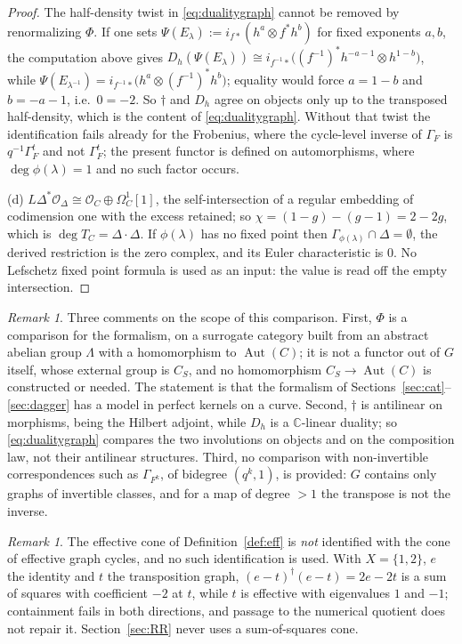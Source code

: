\documentclass[11pt]{amsart}
\theoremstyle{definition}
\theoremstyle{remark}
\newtheorem{remark}[theorem]{Remark}
\newcommand{\C}{\mathbb C}
\newcommand{\Aut}{\operatorname{Aut}}
\begin{document}
\begin{proof}
The half-density twist in \eqref{eq:dualitygraph} cannot be removed by
renormalizing $\Phi$.  If one sets $\Psi(E_{\lambda}):=i_{f*}(h^{a}\otimes
f^{*}h^{b})$ for fixed exponents $a,b$, the computation above gives
$D_h(\Psi(E_{\lambda}))\cong i_{f^{-1}*}\bigl((f^{-1})^{*}h^{-a-1}\otimes
h^{1-b}\bigr)$, while $\Psi(E_{\lambda^{-1}})=i_{f^{-1}*}\bigl(h^{a}\otimes
(f^{-1})^{*}h^{b}\bigr)$; equality would force $a=1-b$ and $b=-a-1$, i.e.\
$0=-2$.  So $\dagger$ and $D_h$ agree on objects only up to the transposed
half-density, which is the content of \eqref{eq:dualitygraph}.  Without that
twist the identification fails already for the Frobenius, where the cycle-level
inverse of $\Gamma_F$ is $q^{-1}\Gamma_F^{t}$ and not $\Gamma_F^{t}$; the
present functor is defined on automorphisms, where $\deg\phi(\lambda)=1$ and no
such factor occurs.

(d)  $L\Delta^{*}\mathcal O_{\Delta}\cong\mathcal O_C\oplus\Omega^{1}_C[1]$,
the self-intersection of a regular embedding of codimension one with the excess
retained; so $\chi=(1-g)-(g-1)=2-2g$, which is $\deg T_C=\Delta\cdot\Delta$.  If
$\phi(\lambda)$ has no fixed point then $\Gamma_{\phi(\lambda)}\cap\Delta=
\emptyset$, the derived restriction is the zero complex, and its Euler
characteristic is $0$.  No Lefschetz fixed point formula is used as an input:
the value is read off the empty intersection.
\end{proof}

\begin{remark}\label{rem:classicalscope}
Three comments on the scope of this comparison.  First, $\Phi$ is a comparison for the
formalism, on a surrogate category built from an abstract abelian group
$\Lambda$ with a homomorphism to $\Aut(C)$; it is not a functor out of $G$
itself, whose external group is $C_S$, and no homomorphism $C_S\to\Aut(C)$ is
constructed or needed.  The statement is that the formalism of
Sections~\ref{sec:cat}--\ref{sec:dagger} has a model in perfect kernels on a
curve.  Second, $\dagger$ is antilinear on morphisms, being the Hilbert adjoint,
while $D_h$ is a $\C$-linear duality; so \eqref{eq:dualitygraph} compares the
two involutions on objects and on the composition law, not their antilinear
structures.  Third, no comparison with non-invertible
correspondences such as $\Gamma_{F^{k}}$, of bidegree $(q^{k},1)$, is provided:
$G$ contains only graphs of invertible classes, and for a map of degree $>1$
the transpose is not the inverse.
\end{remark}

\begin{remark}\label{rem:effcone}
The effective cone of Definition~\ref{def:eff} is \emph{not} identified with
the cone of effective graph cycles, and no such identification is used.  With
$X=\{1,2\}$, $e$ the identity and $t$ the transposition graph,
$(e-t)^{\dagger}(e-t)=2e-2t$ is a sum of squares with coefficient $-2$ at $t$,
while $t$ is effective with eigenvalues $1$ and $-1$; containment fails in both
directions, and passage to the numerical quotient does not repair it.
Section~\ref{sec:RR} never uses a sum-of-squares cone.
\end{remark}
\end{document}
